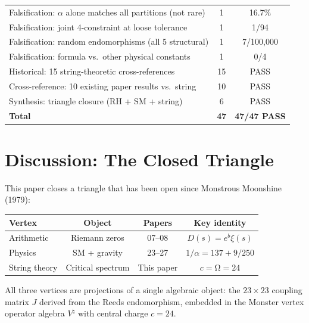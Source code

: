 \documentclass[12pt,a4paper]{article}
\theoremstyle{definition}\newtheorem{definition}[theorem]{Definition}
\theoremstyle{remark}\newtheorem{remark}[theorem]{Remark}
\renewcommand{\O}{\mathrm{\Omega}}
\newcommand{\Jcoup}{J}
\newcommand{\VOA}{V^\natural}
\begin{document}
\begin{center}
\begin{tabular}{lcc}
Falsification: $\alpha$ alone matches all partitions (not rare) & 1 & \textcolor{computational}{16.7\%} \\
Falsification: joint 4-constraint at loose tolerance & 1 & \textcolor{proved}{1/94} \\
Falsification: random endomorphisms (all 5 structural) & 1 & \textcolor{proved}{7/100{,}000} \\
Falsification: formula vs.\ other physical constants & 1 & \textcolor{proved}{0/4} \\
Historical: 15 string-theoretic cross-references & 15 & \textcolor{proved}{PASS} \\
Cross-reference: 10 existing paper results vs.\ string & 10 & \textcolor{proved}{PASS} \\
Synthesis: triangle closure (RH + SM + string) & 6 & \textcolor{proved}{PASS} \\
\midrule
\textbf{Total} & \textbf{47} & \textbf{47/47 PASS} \\
\bottomrule
\end{tabular}
\end{center}

\section{Discussion: The Closed Triangle}
\label{sec:discussion}

This paper closes a triangle that has been open since Monstrous Moonshine
(1979):

\begin{center}
\begin{tabular}{lccc}
\toprule
\textbf{Vertex} & \textbf{Object} & \textbf{Papers} & \textbf{Key identity} \\
\midrule
Arithmetic & Riemann zeros & 07--08 & $D(s) = e^b \xi(s)$ \\
Physics & SM + gravity & 23--27 & $1/\alpha = 137 + 9/250$ \\
String theory & Critical spectrum & This paper & $c = \O = 24$ \\
\bottomrule
\end{tabular}
\end{center}

All three vertices are projections of a single algebraic object: the $23 \times
23$ coupling matrix $\Jcoup$ derived from the Reeds endomorphism, embedded in the
Monster vertex operator algebra $\VOA$ with central charge $c = 24$.
\end{document}
